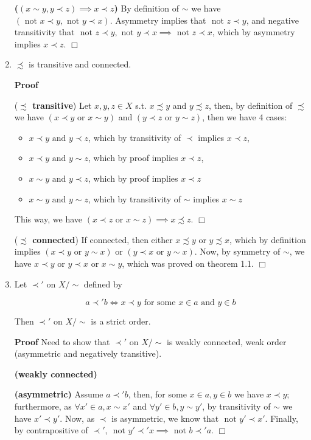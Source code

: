\documentclass{article}
\theoremstyle{definition}
\def\tor{\text{ or }}
\def\tand{\text{ and }}
\def\tnot{\text{ not }}
\begin{document}
\begin{enumerate}
{\bf ($(x\sim y,y\prec z)\implies x\prec z$)} By definition of $\sim$ we have $(\tnot x\prec y,\tnot y\prec x)$. Asymmetry implies that $\tnot z\prec y$, and negative transitivity that $\tnot z\prec y,\tnot y\prec x\implies \tnot z\prec x$, which by asymmetry implies $x\prec z$. $\Box$



\item $\precsim$ is transitive and connected.

{\bf Proof}

({\bf $\precsim$ transitive}) Let $x,y,z\in X$ s.t. $x\precsim y$ and $y\precsim z$, then, by definition of $\precsim$ we have $(x\prec y\tor x\sim y)$ and $(y\prec z\tor y\sim z)$, then we have 4 cases:

\begin{itemize}
\item $x\prec y\tand y\prec z$, which by transitivity of $\prec$ implies $x\prec z$,
\item $x\prec y\tand y\sim z$, which by proof implies $x\prec z$,
\item $x\sim y\tand y\prec z$, which by proof implies $x\prec z$
\item $x\sim y\tand y\sim z$, which by transitivity of $\sim$ implies $x\sim z$
\end{itemize}

This way, we have $(x\prec z\tor x\sim z)\implies x\precsim z$. $\Box$

({\bf $\precsim$ connected}) If connected, then either $x\precsim y$ or $y\precsim x$, which by definition implies $(x\prec y\tor y\sim x)\tor(y\prec x\tor y\sim x)$. Now, by symmetry of $\sim$, we have $x\prec y\tor y\prec x\tor x\sim y$, which was proved on theorem 1.1. $\Box$

\item Let $\prec'$ on $X/\sim$ defined by

\begin{equation*}
a\prec' b \iff x\prec y\text{ for some $x\in a$ and $y\in b$}
\end{equation*}

Then $\prec'$ on $X/\sim$ is a strict order.

{\bf Proof} Need to show that $\prec'$ on $X/\sim$ is weakly connected, weak order (asymmetric and negatively transitive).

{\bf (weakly connected)} 

{\bf (asymmetric)} Assume $a\prec' b$, then, for some $x\in a, y\in b$ we have $x\prec y$; furthermore, as $\forall x'\in a, x\sim x'$ and $\forall y'\in b, y\sim y'$, by transitivity of $\sim$ we have $x'\prec y'$. Now, as $\prec$ is asymmetric, we know that $\tnot y'\prec x'$. Finally, by contrapositive of $\prec'$, $\tnot y'\prec' x\implies \tnot b\prec' a$. $\Box$


\end{enumerate}
\end{document}
